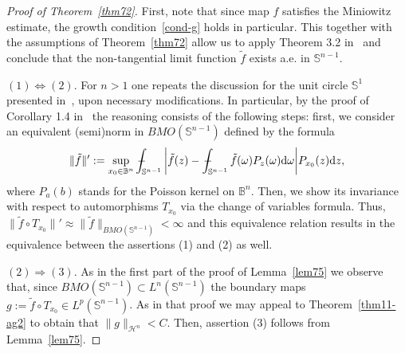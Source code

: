 \documentclass[11pt,a4paper,reqno]{amsart}
\theoremstyle{definition}
\def\vint{\mathop{\mathchoice%
          {\setbox0\hbox{$\displaystyle\intop$}\kern 0.22\wd0%
           \vcenter{\hrule width 0.6\wd0}\kern -0.82\wd0}%
          {\setbox0\hbox{$\textstyle\intop$}\kern 0.2\wd0%
           \vcenter{\hrule width 0.6\wd0}\kern -0.8\wd0}%
          {\setbox0\hbox{$\scriptstyle\intop$}\kern 0.2\wd0%
           \vcenter{\hrule width 0.6\wd0}\kern -0.8\wd0}%
          {\setbox0\hbox{$\scriptscriptstyle\intop$}\kern 0.2\wd0%
           \vcenter{\hrule width 0.6\wd0}\kern -0.8\wd0}}%
          \mathopen{}\int}
\newcommand{\om}{\omega}
\newcommand{\B}{\mathbb{B}^n}
\newcommand{\ud}{\mathrm {d}}
\newcommand{\Sn}{\mathbb{S}^{n-1}}
\numberwithin{komcounter}{section}
\begin{document}
\begin{proof}[Proof of Theorem~\ref{thm72}]
First, note that since map $f$ satisfies the Miniowitz estimate, the growth condition~\eqref{cond-g} holds in particular. This together with the assumptions of Theorem~\ref{thm72} allow us to apply Theorem 3.2 in~\cite{ag2} and conclude that the non-tangential limit function $\tilde{f}$ exists a.e. in $\Sn$.

\smallskip

\noindent $(1)\Leftrightarrow (2)$. For $n>1$ one repeats the discussion for the unit circle $\mathbb{S}^1$ presented in~\cite[Chaper VI.1]{g}, upon necessary modifications. In particular, by the proof of Corollary 1.4 in~\cite[Ch VI]{g} the reasoning consists of the following steps: first, we consider an equivalent (semi)norm in $BMO(\Sn)$ defined by the formula 
$$
\|\tilde{f}\|':=\sup_{x_0\in \B} \vint_{\Sn} \bigg|\tilde{f}(z)-\vint_{\Sn} \tilde{f}(\om) P_{z}(\om) \ud\om\bigg|P_{x_0}(z)\ud z,
$$
where $P_{a}(b)$ stands for the Poisson kernel on $\B$. Then, we show its invariance with respect to automorphisms $T_{x_0}$ via the change of variables formula. Thus, $\|\tilde{f}\circ T_{x_0}\|'\approx \|\tilde{f}\|_{BMO(\Sn)}<\infty$
and this equivalence relation results in the equivalence between  the assertions (1) and (2) as well.
\smallskip

\noindent $(2)\Rightarrow (3)$. As in the first part of the proof of Lemma~\ref{lem75} we observe that, since $BMO(\Sn)\subset L^n(\Sn)$ the boundary maps $g:=\tilde{f}\circ T_{x_0}\in L^p(\Sn)$. As in that proof we may appeal to Theorem~\ref{thm11-ag2} to obtain that  $\|g\|_{\mathcal{H}^n}<C$. Then, assertion (3) follows from Lemma~\ref{lem75}.

\smallskip


\end{proof}
\end{document}
